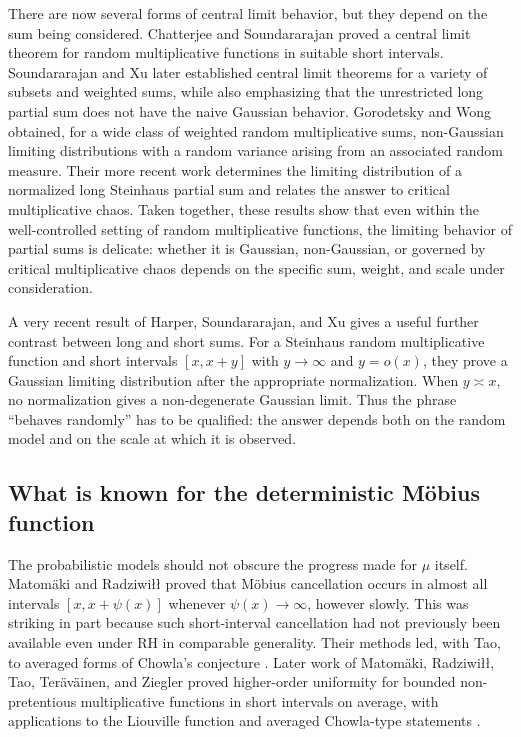 \documentclass[11pt]{article}
\theoremstyle{remark}
\begin{document}
There are now several forms of central limit behavior, but they depend
on the sum being considered.  Chatterjee and Soundararajan
\cite{ChatterjeeSoundararajan} proved a central limit theorem for
random multiplicative functions in suitable short intervals.
Soundararajan and Xu \cite{SoundararajanXu} later established central
limit theorems for a variety of subsets and weighted sums, while also
emphasizing that the unrestricted long partial sum does not have the
naive Gaussian behavior.  Gorodetsky and Wong
\cite{GorodetskyWongMartingale} obtained, for a wide class of weighted
random multiplicative sums, non-Gaussian limiting distributions with a
random variance arising from an associated random measure.  Their more
recent work \cite{GorodetskyWongLimit} determines the limiting
distribution of a normalized long Steinhaus partial sum and relates the
answer to critical multiplicative chaos.  Taken together, these results
show that even within the well-controlled setting of random
multiplicative functions, the limiting behavior of partial sums is
delicate: whether it is Gaussian, non-Gaussian, or governed by critical
multiplicative chaos depends on the specific sum, weight, and scale
under consideration.

A very recent result of Harper, Soundararajan, and Xu
\cite{HarperSoundararajanXu2026} gives a useful further contrast between
long and short sums.  For a Steinhaus random multiplicative function and
short intervals \([x,x+y]\) with \(y\to\infty\) and \(y=o(x)\), they
prove a Gaussian limiting distribution after the appropriate
normalization.  When \(y\asymp x\), no normalization gives a
non-degenerate Gaussian limit.  Thus the phrase ``behaves randomly''
has to be qualified: the answer depends both on the random model and on
the scale at which it is observed.

\subsection{What is known for the deterministic M\"obius function}

The probabilistic models should not obscure the progress made for
\(\mu\) itself.  Matom\"aki and Radziwi\l\l \cite{MatomakiRadziwill}
proved that M\"obius cancellation occurs in almost all intervals
\([x,x+\psi(x)]\) whenever \(\psi(x)\to\infty\), however slowly.  This
was striking in part because such short-interval cancellation had not
previously been available even under RH in comparable generality.
Their methods led, with Tao, to averaged forms of Chowla's conjecture
\cite{MatomakiRadziwillTao}.  Later work of Matom\"aki, Radziwi\l\l,
Tao, Ter\"av\"ainen, and Ziegler proved higher-order uniformity for
bounded non-pretentious multiplicative functions in short intervals on
average, with applications to the Liouville function and averaged
Chowla-type statements \cite{MRTTZ}.
\end{document}
